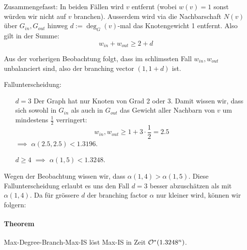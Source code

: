 Zusammengefasst:
In beiden Fällen wird $v$ entfernt (wobei $w(v)=1$ sonst würden wir nicht auf $v$ branchen).
Ausserdem wird via die Nachbarschaft $N(v)$ über $G_{in}, G_{out}$ hinweg $d := \deg_G(v)$-mal
das Knotengewicht 1 entfernt. Also gilt in der Summe:
$$ w_{in} + w_{out} \geq 2 + d $$

Aus der vorherigen Beobachtung folgt, dass im schlimssten Fall $w_{in}, w_{out}$ unbalanciert sind, also der
branching vector $(1, 1 + d)$ ist.

Fallunterscheidung:
\begin{itemize}
    \item[$d=3$]
    Der Graph hat nur Knoten von Grad 2 oder 3.
    Damit wissen wir, dass sich sowohl in $G_{in}$ als auch in $G_{out}$ das Gewicht aller Nachbarn
    von $v$ um mindestens $\frac{1}{2}$ verringert:
    $$ w_{in}, w_{out} \geq 1 + 3 \cdot \frac{1}{2} = 2.5 $$
    $\implies$ $\alpha(2.5, 2.5) < 1.3196$.
    \item[$d \geq4 $]
    $\implies$ $\alpha(1, 5) < 1.3248$.
\end{itemize}
Wegen der Beobachtung wissen wir, dass $\alpha(1, 4) > \alpha(1, 5)$.
Diese Fallunterscheidung erlaubt es uns den Fall $d=3$ besser abzuschätzen als mit $\alpha(1, 4)$.
Da für grössere $d$ der branching factor $\alpha$ nur kleiner wird, können wir folgern:

\paragraph{Theorem}
Max-Degree-Branch-Max-IS löst Max-IS in Zeit $\mathcal{O}^*(1.3248^n)$.
